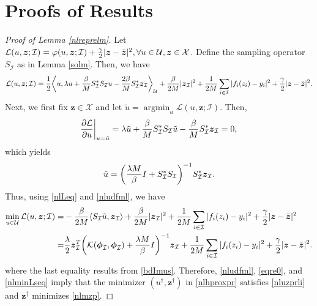 \documentclass[10pt,reqno]{amsart}
\newcommand{\argmin}{\operatorname{argmin}}
\newcommand{\1}{{\chi}}
\numberwithin{equation}{section}
\theoremstyle{thmlemcorr}
\numberwithin{theorem}{section}
\theoremstyle{thmlemcorr*}
\theoremstyle{defi}
\theoremstyle{remexample}
\theoremstyle{ass}
\begin{document}
\section{Proofs of Results}
\label{secAppendix}
\begin{proof}[Proof of Lemma \ref{nlreprelm}]
	Let 
	$\mathcal{L}(u, \boldsymbol{z}; \mathcal{I}) = \varphi(u, \boldsymbol{z}; \mathcal{I}) + \frac{\gamma}{2}|\boldsymbol{z} - \Bar{\boldsymbol{z}}|^2, \forall u\in \mathcal{U}, \boldsymbol{z}\in \mathcal{X}$. 
	Define the sampling operator  ${S}_{\mathcal{I}}$ as in Lemma \eqref{solm}. Then, we have
	\begin{align}
		\label{nlLeq}
		\mathcal{L}(u, \boldsymbol{z}; \mathcal{I}) 
		= \frac{1}{2}\bigg\langle {u}, \lambda {u} + \frac{\beta}{M}S_{\mathcal{I}}^*S_{\mathcal{I}}{u} - \frac{2\beta}{M}S_{\mathcal{I}}^*\boldsymbol{z}_{\mathcal{I}}\bigg\rangle_{\mathcal{U}}
		+ \frac{\beta}{2M}|\boldsymbol{z}_{\mathcal{I}}|^2 + \frac{1}{2M}\sum_{i\in \mathcal{I}}|f_i(z_i)-y_i|^2 + \frac{\gamma}{2}|\boldsymbol{z} - \Bar{\boldsymbol{z}}|^2.
	\end{align}
	Next, we first fix $\boldsymbol{z}\in \mathcal{X}$ and let  $\tilde{u}=\argmin_{u}\mathcal{L}(u, \boldsymbol{z};\mathcal{I})$.  
	Then, 
	$$\frac{\partial\mathcal{L}}{\partial u}\bigg |_{u=\Tilde{u}} = \lambda \Tilde{u} + \frac{\beta}{M}S_{\mathcal{I}}^*S_{\mathcal{I}}\Tilde{u} - \frac{\beta}{M}S_{\mathcal{I}}^*\boldsymbol{z}_{\mathcal{I}} = 0, $$
	which yields
	\begin{align}
		\label{nludfml}
		\Tilde{u} = \bigg(\frac{\lambda M}{\beta}I + S^*_{\mathcal{I}}S_{\mathcal{I}} \bigg)^{-1}S_{\mathcal{I}}^*\boldsymbol{z}_{\mathcal{I}}. 
	\end{align}
	Thus, using \eqref{nlLeq} and \eqref{nludfml}, we have
	\begin{align}
		\min_{u\in \mathcal{U}}\mathcal{L}(u, \boldsymbol{z}; \mathcal{I}) 
		=& -\frac{\beta}{2M}\langle S_{\mathcal{I}}\Tilde{u}, \boldsymbol{z}_{\mathcal{I}}\rangle + \frac{\beta}{2M}|\boldsymbol{z}_{\mathcal{I}}|^2 + \frac{1}{2M}\sum_{i\in \mathcal{I}}|f_i(z_i) - y_i|^2 + \frac{\gamma}{2}|\boldsymbol{z} - \Bar{\boldsymbol{z}}|^2\nonumber\\
		=& \frac{\lambda}{2}\boldsymbol{z}^T_{\mathcal{I}}\bigg(\mathcal{K}(\boldsymbol{\phi}_{\mathcal{I}}, \boldsymbol{\phi}_{\mathcal{I}}) + \frac{\lambda M}{\beta}I\bigg)^{-1}\boldsymbol{z}_{\mathcal{I}}+ \frac{1}{2M}\sum_{i\in \mathcal{I}}|f_i(z_i) - y_i|^2 +  \frac{\gamma}{2}|\boldsymbol{z} - \Bar{\boldsymbol{z}}|^2. \label{nlminLseq}
	\end{align} 
	where the last equality results from \eqref{bdImus}. 
	Therefore, \eqref{nludfml},  \eqref{eqre0}, and  \eqref{nlminLseq} imply that the minimizer $(u^\dagger, \boldsymbol{z}^\dagger)$ in \eqref{nlhproxpr} satisfies \eqref{nluzprli} and $\boldsymbol{z}^\dagger$ minimizes \eqref{nlmzp}.
\end{proof}
\end{document}
